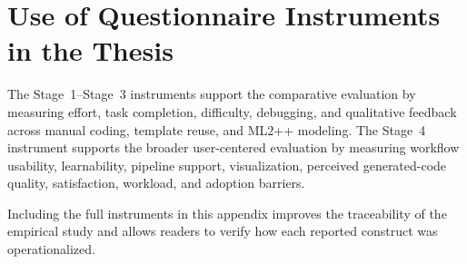 \section{Use of Questionnaire Instruments in the Thesis}
\label{app:questionnaire_use_in_thesis}

The Stage~1--Stage~3 instruments support the comparative evaluation by measuring effort, task completion, difficulty, debugging, and qualitative feedback across manual coding, template reuse, and ML2++ modeling. The Stage~4 instrument supports the broader user-centered evaluation by measuring workflow usability, learnability, pipeline support, visualization, perceived generated-code quality, satisfaction, workload, and adoption barriers.

Including the full instruments in this appendix improves the traceability of the empirical study and allows readers to verify how each reported construct was operationalized.


